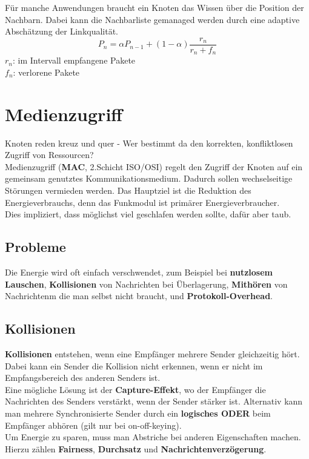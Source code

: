 \documentclass[a4paper]{article}
\begin{document}
Für manche Anwendungen braucht ein Knoten das Wissen über die Position der Nachbarn. Dabei kann die Nachbarliste gemanaged werden durch eine adaptive Abschätzung der Linkqualität.
$$P_n = \alpha P_{n-1} + (1-\alpha)\frac{r_n}{r_n+f_n}$$
$r_n$: im Intervall empfangene Pakete\\
$f_n$: verlorene Pakete

\newpage
\section{Medienzugriff}
Knoten reden kreuz und quer - Wer bestimmt da den korrekten, konfliktlosen Zugriff von Ressourcen?\\

Medienzugriff (\textbf{MAC}, 2.Schicht ISO/OSI) regelt den Zugriff der Knoten auf ein gemeinsam genutztes Kommunikationsmedium. Dadurch sollen wechselseitige Störungen vermieden werden. Das Hauptziel ist die Reduktion des Energieverbrauchs, denn das Funkmodul ist primärer Energieverbraucher.	\\

Dies impliziert, dass möglichst viel geschlafen werden sollte, dafür aber taub.
\subsection{Probleme}
Die Energie wird oft einfach verschwendet, zum Beispiel bei \textbf{nutzlosem Lauschen}, \textbf{Kollisionen} von Nachrichten bei Überlagerung, \textbf{Mithören} von Nachrichtenm die man selbst nicht braucht, und \textbf{Protokoll-Overhead}.\\

\subsection{Kollisionen}
\textbf{Kollisionen} entstehen, wenn eine Empfänger mehrere Sender gleichzeitig hört. Dabei kann ein Sender die Kollision nicht erkennen, wenn er nicht im Empfangsbereich des anderen Senders ist.\\

Eine mögliche Lösung ist der \textbf{Capture-Effekt}, wo der Empfänger die Nachrichten des Senders verstärkt, wenn der Sender stärker ist. Alternativ kann man mehrere Synchronisierte Sender durch ein \textbf{logisches ODER} beim Empfänger abhören (gilt nur bei on-off-keying).\\

Um Energie zu sparen, muss man Abstriche bei anderen Eigenschaften machen. Hierzu zählen \textbf{Fairness}, \textbf{Durchsatz} und \textbf{Nachrichtenverzögerung}.
\end{document}
